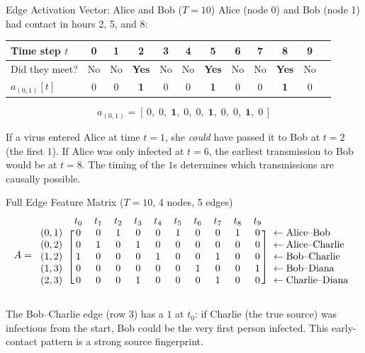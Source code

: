\begin{examplebox}{Edge Activation Vector: Alice and Bob ($T=10$)}
Alice (node 0) and Bob (node 1) had contact in hours 2, 5, and 8:

\begin{center}
\begin{tabular}{lccccccccccc}
\toprule
Time step $t$ & 0 & 1 & \textbf{2} & 3 & 4 & \textbf{5} & 6 & 7 & \textbf{8} & 9 \\
\midrule
Did they meet? & No & No & \textbf{Yes} & No & No & \textbf{Yes} & No & No & \textbf{Yes} & No \\
$a_{(0,1)}[t]$ & 0 & 0 & \textbf{1} & 0 & 0 & \textbf{1} & 0 & 0 & \textbf{1} & 0 \\
\bottomrule
\end{tabular}
\end{center}

\[
a_{(0,1)} = [\,0,\; 0,\; \mathbf{1},\; 0,\; 0,\; \mathbf{1},\; 0,\; 0,\; \mathbf{1},\; 0\,]
\]

If a virus entered Alice at time $t=1$, she \textit{could} have passed it to Bob at $t=2$ (the first $1$). If Alice was only infected at $t=6$, the earliest transmission to Bob would be at $t=8$. The timing of the $1$s determines which transmissions are causally possible.
\end{examplebox}

\begin{examplebox}{Full Edge Feature Matrix ($T=10$, 4 nodes, 5 edges)}
\[
A = \begin{blockarray}{cccccccccccl}
 & t_0 & t_1 & t_2 & t_3 & t_4 & t_5 & t_6 & t_7 & t_8 & t_9 & \\
\begin{block}{c[cccccccccc]l}
(0,1) & 0 & 0 & 1 & 0 & 0 & 1 & 0 & 0 & 1 & 0 & \leftarrow\text{Alice--Bob} \\
(0,2) & 0 & 1 & 0 & 1 & 0 & 0 & 0 & 0 & 0 & 0 & \leftarrow\text{Alice--Charlie} \\
(1,2) & 1 & 0 & 0 & 0 & 1 & 0 & 0 & 1 & 0 & 0 & \leftarrow\text{Bob--Charlie} \\
(1,3) & 0 & 0 & 0 & 0 & 0 & 0 & 1 & 0 & 0 & 1 & \leftarrow\text{Bob--Diana} \\
(2,3) & 0 & 0 & 0 & 1 & 0 & 0 & 0 & 1 & 0 & 0 & \leftarrow\text{Charlie--Diana} \\
\end{block}
\end{blockarray}
\]

The Bob--Charlie edge (row 3) has a $1$ at $t_0$: if Charlie (the true source) was infectious from the start, Bob could be the very first person infected. This early-contact pattern is a strong source fingerprint.
\end{examplebox}

